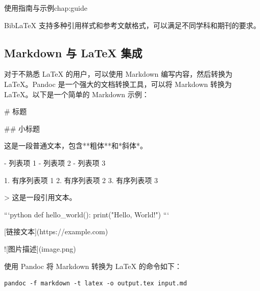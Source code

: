 \begin{cuzchapter}{使用指南与示例}{chap:guide}
\begin{listing}[htbp]
\begin{texcode}
            

            \cite{lamport1986document}
            \textcite{chen1980zhongguo}
            \parencite{stamerjohanns2009mathml}

            \printbibliography[title=参考文献]
        \end{texcode}
    \end{listing}

    Bib\LaTeX{} 支持多种引用样式和参考文献格式，可以满足不同学科和期刊的要求。

    \subsection{Markdown 与 \LaTeX{} 集成}\label{sub:markdown}

    对于不熟悉 \LaTeX{} 的用户，可以使用 Markdown 编写内容，然后转换为 \LaTeX{}。Pandoc 是一个强大的文档转换工具，可以将 Markdown 转换为 \LaTeX{}。以下是一个简单的 Markdown 示例：

    \begin{listing}[htbp]
        \caption{Markdown 示例}
        \label{code:markdown-example}
        \begin{mdcode}
            # 标题

            ## 小标题

            这是一段普通文本，包含**粗体**和*斜体*。

            - 列表项 1
            - 列表项 2
            - 列表项 3

            1. 有序列表项 1
            2. 有序列表项 2
            3. 有序列表项 3

            > 这是一段引用文本。

            ```python
            def hello_world():
                print("Hello, World!")
            ```

            [链接文本](https://example.com)

            ![图片描述](image.png)
        \end{mdcode}
    \end{listing}

    使用 Pandoc 将 Markdown 转换为 \LaTeX{} 的命令如下：

    \begin{verbatim}
pandoc -f markdown -t latex -o output.tex input.md
    \end{verbatim}


\end{cuzchapter}
